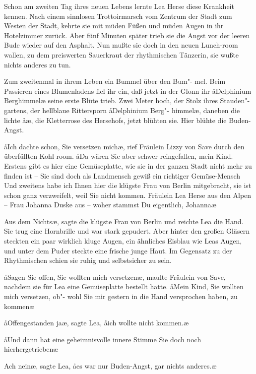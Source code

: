 Schon am zweiten Tag ihres neuen Lebens lernte Lea Herse
diese Krankheit kennen. Nach einem sinnlosen Trottoirmarsch
vom Zentrum der Stadt zum Westen der Stadt, kehrte sie
mit müden Füßen und müden Augen in ihr Hotelzimmer
zurück. Aber fünf Minuten später trieb sie die Angst vor der
leeren Bude wieder auf den Asphalt. Nun mußte sie doch in den
neuen Lunch-room wallen, zu dem preiswerten Sauerkraut
der rhythmischen Tänzerin, sie wußte nichts anderes zu tun.

Zum zweitenmal in ihrem Leben ein Bummel über den Bum"-%
mel. Beim Passieren eines Blumenladens fiel ihr ein, daß
jetzt in der Glonn ihr \aa{}Delphinium Berghimmel\ae{} seine erste
Blüte trieb. Zwei Meter hoch, der Stolz ihres Stauden"-%
gartens, der hellblaue Rittersporn \aa{}Delphinium Berg"-%
himmel\ae{}, daneben die lichte \aa{}\ae{}, die
Kletterrose des Hersehofs, jetzt blühten sie. Hier blühte die
Buden-Angst.

\aa{}Ich dachte schon, Sie versetzen mich\ae{}, rief Fräulein Lizzy
von Save durch den überfüllten Kohl-room. \aa{}Da wären Sie
aber schwer reingefallen, mein Kind. Erstens gibt es hier eine
Gemüseplatte, wie sie in der ganzen Stadt nicht mehr zu
finden ist -- Sie sind doch als Landmensch gewiß ein richtiger
Gemüse-Mensch\frag{} Und zweitens habe ich Ihnen hier die klügste
Frau von Berlin mitgebracht, sie ist schon ganz verzweifelt,
weil Sie nicht kommen. Fräulein Lea Herse aus den Alpen --
Frau Johanna Duske aus -- woher stammst Du eigentlich,
Johanna\frag{}\ae{}

\aanah{}Aus dem Nichts\ae{}, sagte die klügste Frau von Berlin und
reichte Lea die Hand. Sie trug eine Hornbrille und war stark
gepudert. Aber hinter den großen Gläsern steckten ein paar
wirklich kluge Augen, ein ähnliches Eisblau wie Leas Augen,
und unter dem Puder steckte eine frische junge Haut. Im
Gegensatz zu der Rhythmischen schien sie ruhig und selbstsicher
zu sein.

\aa{}Sagen Sie offen, Sie wollten mich versetzen\frag{}\ae{}, maulte
Fräulein von Save, nachdem sie für Lea eine Gemüseplatte
bestellt hatte. \aa{}Mein Kind, Sie wollten mich versetzen, ob"-%
wohl Sie mir gestern in die Hand versprochen haben, zu
kommen\frag{}\ae{}

\aa{}Offengestanden ja\ae{}, sagte Lea, \aa{}ich wollte nicht kommen.\ae{}

\aa{}Und dann hat eine geheimnisvolle innere Stimme Sie doch
noch hierhergetrieben\frag{}\ae{}

\aanah{}Ach nein\ae{}, sagte Lea, \aa{}es war nur Buden-Angst, gar nichts
anderes.\ae{}

